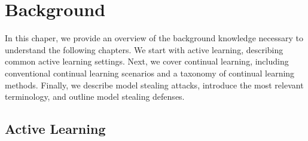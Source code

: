 
\chapter{Background}
\label{ch:Background}

In this chaper, we provide an overview of the background knowledge necessary to understand the following chapters. We start with
active learning, describing common active learning settings. Next, we cover continual learning, including conventional continual learning
scenarios and a taxonomy of continual learning methods. Finally, we describe model stealing attacks, introduce the most relevant terminology,
and outline model stealing defenses.


\section{Active Learning}
\label{sec:ActiveLearning}

